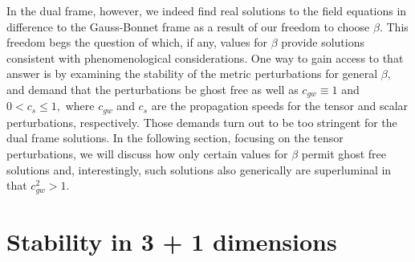 \documentclass[amsmath,amssymb,11pt]{article}
\begin{document}
In the dual frame, however, we indeed find real solutions to the field equations in difference to the Gauss-Bonnet frame as a result of our freedom to choose $\beta.$ This freedom begs the question of which, if any, values for $\beta$ provide solutions consistent with phenomenological considerations. One way to gain access to that answer is by examining the stability of the metric perturbations for general $\beta,$ and demand that the perturbations be ghost free as well as $c_{gw}\equiv 1$ and $0<c_s\leq 1,$ where $c_{gw}$ and $c_s$ are the propagation speeds for the tensor and scalar perturbations, respectively. Those demands turn out to be too stringent for the dual frame solutions. In the following section, focusing on the tensor perturbations, we will discuss how only certain values for $\beta$ permit ghost free solutions and, interestingly, such solutions also generically are superluminal in that $c_{gw}^2>1.$



\section{Stability in 3 + 1 dimensions} \label{sec:stability}
\end{document}
